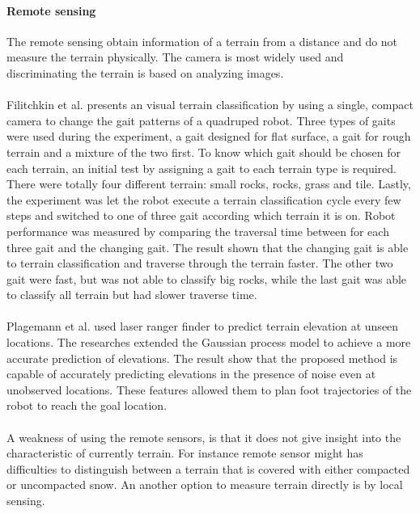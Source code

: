 \documentclass[USenglish]{ifimaster}  %
\begin{document}
\paragraph{Remote sensing}
The remote sensing obtain information of a terrain from a distance and do not measure the terrain physically. The camera is most widely used and discriminating the terrain is based on analyzing images.
\\
\\ 
Filitchkin et al. \cite{littleDog} presents an visual terrain classification by using a single, compact camera to change the gait patterns of a quadruped robot. Three types of gaits were used during the experiment, a gait designed for flat surface, a gait for rough terrain and a mixture of the two first. To know which gait should be chosen for each terrain, an initial test by assigning a gait to each terrain type is required. There were totally four different terrain: small rocks, rocks, grass and tile. Lastly, the experiment was let the robot execute a terrain classification cycle every few steps and switched to one of three gait according which terrain it is on. Robot performance was measured by comparing the traversal time between for each three gait and the changing gait. The result shown that the changing gait is able to terrain classification and traverse through the terrain faster. The other two gait were fast, but was not able to classify big rocks, while the last gait was able to classify all terrain but had slower traverse time.
\\
\\
Plagemann et al. \cite{4651026} used laser ranger finder to predict terrain elevation at unseen locations.
The researches extended the Gaussian process model to achieve a more accurate prediction of elevations. The result show that the proposed method is capable of accurately predicting elevations in the presence of noise even at unobserved locations. These features allowed them to plan foot trajectories of the robot to reach the goal location. 
\\
\\
A weakness of using the remote sensors, is that it does not give insight into the characteristic of currently terrain. For instance remote sensor might has difficulties to distinguish between a terrain that is covered with either compacted or uncompacted snow. An another option to measure terrain directly is by local sensing. 
	
\end{document}
